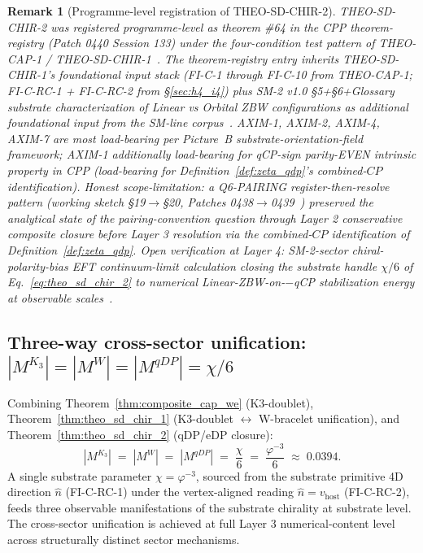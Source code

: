 \documentclass[11pt,letterpaper]{article}
\newtheorem{remark}[theorem]{Remark}
\newcommand{\phig}{\varphi}
\newcommand{\Kthree}{\ensuremath{K_3}}
\begin{document}
\begin{remark}[Programme-level registration of THEO-SD-CHIR-2]\label{rem:theo_sd_chir_2_registration}
THEO-SD-CHIR-2 was registered programme-level as theorem \#64 in the CPP theorem-registry (Patch 0440 Session 133) under the four-condition test pattern of THEO-CAP-1 / THEO-SD-CHIR-1~\cite{abshier_theorem_registry}. The theorem-registry entry inherits THEO-SD-CHIR-1's foundational input stack (FI-C-1 through FI-C-10 from THEO-CAP-1; FI-C-RC-1 + FI-C-RC-2 from \S\ref{sec:h4_i4}) plus SM-2 v1.0 \S5+\S6+Glossary substrate characterization of Linear vs Orbital ZBW configurations as additional foundational input from the SM-line corpus~\cite{abshier_sm2}. AXIM-1, AXIM-2, AXIM-4, AXIM-7 are most load-bearing per Picture~B substrate-orientation-field framework; AXIM-1 additionally load-bearing for qCP-sign parity-EVEN intrinsic property in CPP (load-bearing for Definition~\ref{def:zeta_qdp}'s combined-$CP$ identification). Honest scope-limitation: a Q6-PAIRING register-then-resolve pattern (working sketch \S19$\to$\S20, Patches 0438$\to$0439~\cite{abshier_capotauro_chiral_mechanism_sketch}) preserved the analytical state of the pairing-convention question through Layer 2 conservative composite closure before Layer 3 resolution via the combined-$CP$ identification of Definition~\ref{def:zeta_qdp}. Open verification at Layer 4: SM-2-sector chiral-polarity-bias EFT continuum-limit calculation closing the substrate handle $\chi/6$ of Eq.~\eqref{eq:theo_sd_chir_2} to numerical Linear-ZBW-on-$-$qCP stabilization energy at observable scales~\cite{abshier_research_frontier}.
\end{remark}

\subsection{Three-way cross-sector unification: $|M^{\Kthree}| = |M^W| = |M^{qDP}| = \chi/6$}\label{sec:three_way_unification}

Combining Theorem~\ref{thm:composite_cap_we} (K3-doublet), Theorem~\ref{thm:theo_sd_chir_1} (K3-doublet $\leftrightarrow$ W-bracelet unification), and Theorem~\ref{thm:theo_sd_chir_2} (qDP/eDP closure):
\begin{equation}\label{eq:three_way_unification}
|M^{\Kthree}| \;=\; |M^W| \;=\; |M^{qDP}| \;=\; \frac{\chi}{6} \;=\; \frac{\phig^{-3}}{6} \;\approx\; 0.0394.
\end{equation}
A single substrate parameter $\chi = \phig^{-3}$, sourced from the substrate primitive 4D direction $\hat{n}$ (FI-C-RC-1) under the vertex-aligned reading $\hat{n} = v_{\text{host}}$ (FI-C-RC-2), feeds three observable manifestations of the substrate chirality at substrate level. The cross-sector unification is achieved at full Layer 3 numerical-content level across structurally distinct sector mechanisms.
\end{document}
